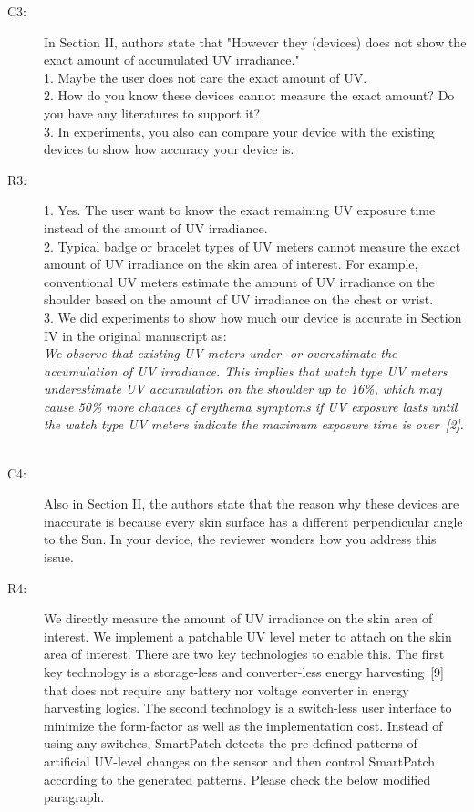 \documentclass[onecolumn]{IEEEconf}
\begin{document}
\begin{description}
\item [C3: ] In Section II, authors state that "However they (devices) does not show the exact amount of accumulated UV irradiance." \\
1. Maybe the user does not care the exact amount of UV. \\
2. How do you know these devices cannot measure the exact amount? Do you have any literatures to support it?\\
3. In experiments, you also can compare your device with the existing devices to show how accuracy your device is.
\item [R3: ] 1. Yes. The user want to know the exact remaining UV exposure time instead of the amount of UV irradiance.\\
2. Typical badge or bracelet types of UV meters cannot measure the exact amount of UV irradiance on the skin area of interest. For example, conventional UV meters estimate the amount of UV irradiance on the shoulder based on the amount of UV irradiance on the chest or wrist.\\
3. We did experiments to show how much our device is accurate in Section IV in the original manuscript as:\\

\textit{We observe that existing UV meters under- or overestimate the accumulation of UV irradiance. This implies that watch type UV meters underestimate UV accumulation on the shoulder up to 16\%, which may cause 50\% more chances of erythema symptoms if UV exposure lasts until the watch type UV meters indicate the maximum exposure time is over~[2].}
~\\

\item [C4: ] Also in Section II, the authors state that the reason why these devices are inaccurate is because every skin surface has a different perpendicular angle to the Sun. In your device, the reviewer wonders how you address this issue.
\item [R4: ] We directly measure the amount of UV irradiance on the skin area of interest. We implement a patchable UV level meter to attach on the skin area of interest. There are two key technologies to enable this. The first key technology is a storage-less and converter-less energy harvesting~[9] that does not require any battery nor voltage converter in energy harvesting logics. The second technology is a switch-less user interface to minimize the form-factor as well as the implementation cost. Instead of using any switches, SmartPatch detects the pre-defined patterns of artificial UV-level changes on the sensor and then control SmartPatch according to the generated patterns. Please check the below modified paragraph.\\  


\end{description}
\end{document}

